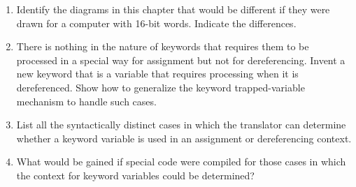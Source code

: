 \begin{enumerate}
\begin{enumerate}
\item Identify the diagrams in this chapter that would be different if
they were drawn for a computer with 16-bit words.  Indicate the
differences.

\item There is nothing in the nature of keywords that requires them to
be processed in a special way for assignment but not for
dereferencing. Invent a new keyword that is a variable that requires
processing when it is dereferenced. Show how to generalize the keyword
trapped-variable mechanism to handle such cases.

\item List all the syntactically distinct cases in which the
translator can determine whether a keyword variable is used in an
assignment or dereferencing context.

\item What would be gained if special code were compiled for those
cases in which the context for keyword variables could be determined?

\end{enumerate}
\end{enumerate}
